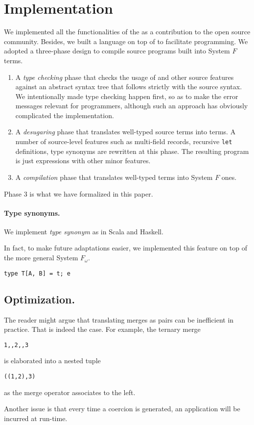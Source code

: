 \section{Implementation}

We implemented all the functionalities of the \name as a contribution to the
open source community. Besides, we built a language on top of \name to
facilitate programming. We adopted a three-phase design to compile source
programs built into System $ F $ terms.

\begin{enumerate}
\item A \emph{type checking} phase that checks the usage of \name and other
  source features against an abstract syntax tree that follows strictly with the
  source syntax. We intentionally made type checking happen first, so as to make
  the error messages relevant for programmers, although such an approach has
  obviously complicated the implementation.

\item A \emph{desugaring} phase that translates well-typed source terms into
  \name terms. A number of source-level features such as multi-field records,
  recursive \texttt{let} definitions, type synonyms are rewritten at this phase.
  The resulting program is just \name expressions with other minor features.

\item A \emph{compilation} phase that translates well-typed \name terms
  into System $ F $ ones.
\end{enumerate}

Phase 3 is what we have formalized in this paper.

\paragraph{Type synonyms.}

We implement \emph{type synonym} as in Scala and Haskell.

In fact, to make future adaptations easier, we implemented this feature on top
of the more general System $ F_{\omega} $.


\begin{lstlisting}
type T[A, B] = t; e
\end{lstlisting}

\subsection{Optimization.}

The reader might argue that translating merges as pairs can be inefficient in
practice. That is indeed the case. For example, the ternary merge
\begin{lstlisting}
1,,2,,3 
\end{lstlisting}
is elaborated into a nested tuple
\begin{lstlisting}
((1,2),3)
\end{lstlisting}
as the merge operator associates to the left.

Another issue is that every time a coercion is generated, an application will be
incurred at run-time.

